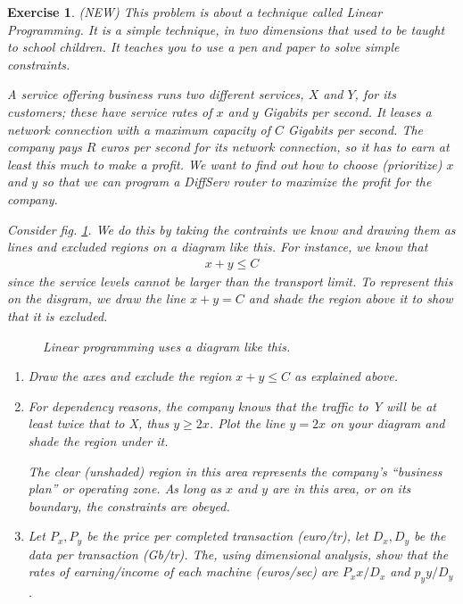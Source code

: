 \documentclass{book}
\newtheorem{exercise}{Exercise}
\def\beq{\begin{eqnarray}}
\def\eeq{\end{eqnarray}}
\begin{document}
\begin{exercise}
(NEW) This problem is about a technique called Linear Programming. It
is a simple technique, in two dimensions that used to be taught to
school children. It teaches you to use a pen and paper to solve simple
constraints.

A service offering business runs two different services,
$X$ and $Y$, for its customers; these have service rates of $x$ and $y$
Gigabits per second.  It leases a network connection with a maximum
capacity of $C$ Gigabits per second. The company pays $R$ euros per
second for its network connection, so it has to earn at least this
much to make a profit. We want to find out how to choose (prioritize)
$x$ and $y$ so that we can program a DiffServ router to maximize
the profit for the company.

Consider fig. \ref{linear}. We do this by taking the contraints we know
and drawing them as lines and excluded regions on a diagram like this.
For instance, we know that
\beq
x + y \le C
\eeq
since the service levels cannot be larger than the transport limit. To
represent this on the disgram, we draw the line $x+y = C$ and shade the
region above it to show that it is excluded.

\begin{figure}[ht]
\begin{center}
\caption{Linear programming uses a diagram like this.\label{linear}}
\end{center}
\end{figure}


\begin{enumerate}
\item Draw the axes and exclude the region $x+y\le C$ as explained above.

\item For dependency reasons, the company knows that the traffic to Y
will be at least twice that to X, thus $y \ge 2x$. Plot the line $y=2x$
on your diagram and shade the region under it.

The clear (unshaded) region in this area represents the company's 
``business plan'' or operating zone. As long as $x$ and $y$ are in this
area, or on its boundary, the constraints are obeyed.

\item Let $P_x,P_y$ be the price per completed transaction (euro/tr), let
$D_x,D_y$ be the data per transaction (Gb/tr). The, using dimensional
analysis, show that the rates of earning/income of each machine (euros/sec) 
are $P_x x/D_x$ and $p_y y/D_y$.


\end{enumerate}
\end{exercise}
\end{document}
